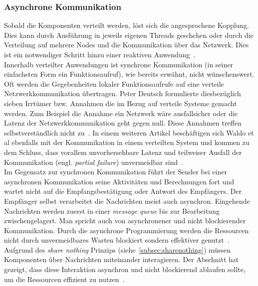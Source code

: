 \subsubsection{Asynchrone Kommunikation}
Sobald die Komponenten verteilt werden, löst sich die angesprochene Kopplung. Dies kann durch Ausführung in jeweils eigenen Threads geschehen oder durch die Verteilung auf mehrere Nodes und die Kommunikation über das Netzwerk. Dies ist ein notwendiger Schritt hinzu einer reaktiven Anwendung~\cite[S.~22]{kuhn_reactive_2015}.\\
Innerhalb verteilter Anwendungen ist synchrone Kommunikation (in seiner einfachsten Form ein Funktionsaufruf), wie bereits erwähnt, nicht wünschenswert. Oft werden die Gegebenheiten lokaler Funktionsaufrufe auf eine verteile Netzwerkkommunikation übertragen. Peter Deutsch formulierte diesbezüglich sieben Irrtümer bzw. Annahmen die im Bezug auf verteile Systeme gemacht werden. Zum Beispiel die Annahme ein Netzwerk wäre ausfallsicher oder die Latenz der Netzwerkkommunikation geht gegen null. Diese Annahmen treffen selbstverständlich nicht zu~\cite[S.~1]{rotem_fallacies_2008}. In einem weiteren Artikel beschäftigen sich Waldo et al ebenfalls mit der Kommunikation in einem verteilten System und kommen zu dem Schluss, dass vorallem unvorhersehbare Latenz und teilweiser Ausfall der Kommunikation (engl. \textit{partial failure}) unvermeidbar sind~\cite{waldo_note_1994}.\\
Im Gegensatz zur synchronen Kommunikation führt der Sender bei einer asynchronen Kommunikation seine Aktivitäten und Berechnungen fort und wartet nicht auf die Empfangsbestätigung oder Antwort des Empfängers. Der Empfänger selbst verarbeitet die Nachrichten meist auch asynchron. Eingehende Nachrichten werden zuerst in einer \textit{message queue} bis zur Bearbeitung zwischengelagert. Man spricht auch von asynchronener und nicht blockierender Kommunikation. Durch die asynchrone Programmierung werden die Ressourcen nicht durch unvermeidbares Warten blockiert sondern effektiver genutzt~\cite[S.~48]{kuhn_reactive_2015}.\\

Aufgrund des \textit{share nothing} Prinzips (siehe~\ref{subsec:sharenothing}) müssen Komponenten über Nachrichten miteinander interagieren. Der Abschnitt hat gezeigt, dass diese Interaktion asynchron und nicht blockierend ablaufen sollte, um die Ressourcen effizient zu nutzen~\cite[S.~48~\&~S.~49]{kuhn_reactive_2015}.

\pagebreak

